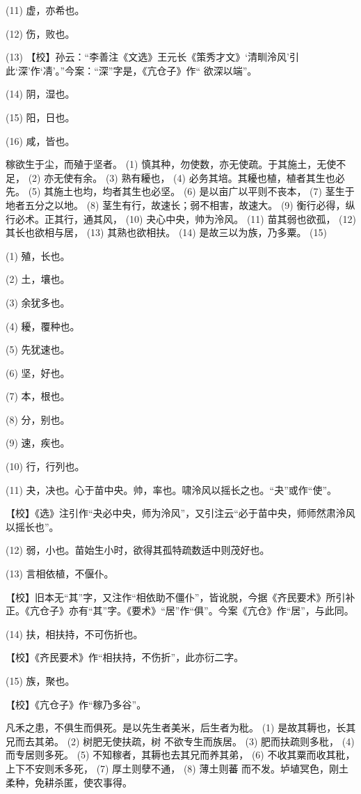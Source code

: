 \documentclass[12pt,UTF8]{ctexbook}
\begin{document}
(11) 虚，亦希也。

(12) 伤，败也。

(13) 【校】孙云：“李善注《文选》王元长《策秀才文》‘清甽泠风’引此‘深’作‘凊’。”今案：“深”字是，《亢仓子》作“ 欲深以端”。

(14) 阴，湿也。

(15) 阳，日也。

(16) 咸，皆也。

稼欲生于尘，而殖于坚者。 (1) 慎其种，勿使数，亦无使疏。于其施土，无使不足， (2) 亦无使有余。 (3) 熟有耰也， (4) 必务其培。其耰也植，植者其生也必先。 (5) 其施土也均，均者其生也必坚。 (6) 是以亩广以平则不丧本， (7) 茎生于地者五分之以地。 (8) 茎生有行，故速长；弱不相害，故速大。 (9) 衡行必得，纵行必术。正其行，通其风， (10) 夬心中央，帅为泠风。 (11) 苗其弱也欲孤， (12) 其长也欲相与居， (13) 其熟也欲相扶。 (14) 是故三以为族，乃多粟。 (15)

(1) 殖，长也。

(2) 土，壤也。

(3) 余犹多也。

(4) 耰，覆种也。

(5) 先犹速也。

(6) 坚，好也。

(7) 本，根也。

(8) 分，别也。

(9) 速，疾也。

(10) 行，行列也。

(11) 夬，决也。心于苗中央。帅，率也。啸泠风以摇长之也。“夬”或作“使”。

【校】《选》注引作“夬必中央，师为泠风”，又引注云“必于苗中央，师师然肃泠风以摇长也”。

(12) 弱，小也。苗始生小时，欲得其孤特疏数适中则茂好也。

(13) 言相依植，不偃仆。

【校】旧本无“其”字，又注作“相依助不僵仆”，皆讹脱，今据《齐民要术》所引补正。《亢仓子》亦有“其”字。《要术》“居”作“俱”。今案《亢仓》作“居”，与此同。

(14) 扶，相扶持，不可伤折也。

【校】《齐民要术》作“相扶持，不伤折”，此亦衍二字。

(15) 族，聚也。

【校】《亢仓子》作“稼乃多谷”。

凡禾之患，不俱生而俱死。是以先生者美米，后生者为秕。 (1) 是故其耨也，长其兄而去其弟。 (2) 树肥无使扶疏，树 不欲专生而族居。 (3) 肥而扶疏则多秕， (4) 而专居则多死。 (5) 不知稼者，其耨也去其兄而养其弟， (6) 不收其粟而收其秕，上下不安则禾多死， (7) 厚土则孽不通， (8) 薄土则蕃 而不发。垆埴冥色，刚土柔种，免耕杀匿，使农事得。
\end{document}
